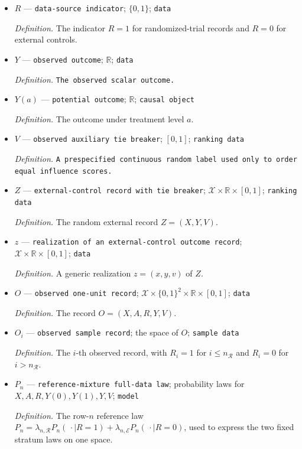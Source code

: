 \documentclass{article}
\begin{document}
\begin{itemize}
  \item \(R\) --- \texttt{data-\allowbreak{}source indicator}; \(\{0,1\}\); \texttt{data}
  \par\smallskip\noindent\emph{Definition.} The indicator \(R=1\) for randomized-trial records and \(R=0\) for external controls.
  \item \(Y\) --- \texttt{observed outcome}; \(\mathbb R\); \texttt{data}
  \par\smallskip\noindent\emph{Definition.} \texttt{The observed scalar outcome.}
  \item \(Y(a)\) --- \texttt{potential outcome}; \(\mathbb R\); \texttt{causal object}
  \par\smallskip\noindent\emph{Definition.} The outcome under treatment level \(a\).
  \item \(V\) --- \texttt{observed auxiliary tie breaker}; \([0,1]\); \texttt{ranking data}
  \par\smallskip\noindent\emph{Definition.} \texttt{A prespecified continuous random label used only to order equal influence scores.}
  \item \(Z\) --- \texttt{external-\allowbreak{}control record with tie breaker}; \(\mathcal X\times\mathbb R\times[0,1]\); \texttt{ranking data}
  \par\smallskip\noindent\emph{Definition.} The random external record \(Z=(X,Y,V)\).
  \item \(z\) --- \texttt{realization of an external-\allowbreak{}control outcome record}; \(\mathcal X\times\mathbb R\times[0,1]\); \texttt{data}
  \par\smallskip\noindent\emph{Definition.} A generic realization \(z=(x,y,v)\) of \(Z\).
  \item \(O\) --- \texttt{observed one-\allowbreak{}unit record}; \(\mathcal X\times\{0,1\}^2\times\mathbb R\times[0,1]\); \texttt{data}
  \par\smallskip\noindent\emph{Definition.} The record \(O=(X,A,R,Y,V)\).
  \item \(O_i\) --- \texttt{observed sample record}; the space of \(O\); \texttt{sample data}
  \par\smallskip\noindent\emph{Definition.} The \(i\)-th observed record, with \(R_i=1\) for \(i\le n_{\mathcal R}\) and \(R_i=0\) for \(i>n_{\mathcal R}\).
  \item \(P_n\) --- \texttt{reference-\allowbreak{}mixture full-\allowbreak{}data law}; probability laws for \(X,A,R,Y(0),Y(1),Y,V\); \texttt{model}
  \par\smallskip\noindent\emph{Definition.} The row-\(n\) reference law \(P_n=\lambda_{n,\mathcal R}P_n(\,\cdot\mid R=1)+\lambda_{n,\mathcal E}P_n(\,\cdot\mid R=0)\), used to express the two fixed stratum laws on one space.

\end{itemize}
\end{document}
